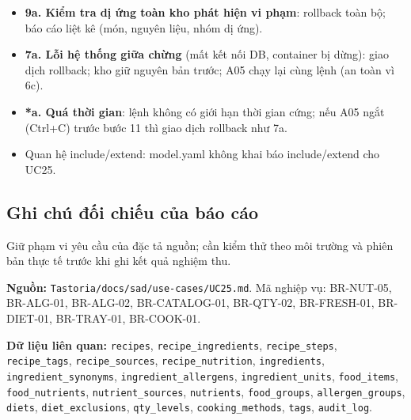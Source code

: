 \begin{itemize}
\item \textbf{9a. Kiểm tra dị ứng toàn kho phát hiện vi phạm}: rollback toàn bộ; báo cáo liệt kê (món, nguyên liệu, nhóm dị ứng).
\item \textbf{7a. Lỗi hệ thống giữa chừng} (mất kết nối DB, container bị dừng): giao dịch rollback; kho giữ nguyên bản trước; A05 chạy lại cùng lệnh (an toàn vì 6c).
\item \textbf{*a. Quá thời gian}: lệnh không có giới hạn thời gian cứng; nếu A05 ngắt (Ctrl+C) trước bước 11 thì giao dịch rollback như 7a.
\item Quan hệ include/\allowbreak{}extend: model.yaml không khai báo include/\allowbreak{}extend cho UC25.
\end{itemize}
\subsection{Ghi chú đối chiếu của báo cáo}
Giữ phạm vi yêu cầu của đặc tả nguồn; cần kiểm thử theo môi trường và phiên bản thực tế trước khi ghi kết quả nghiệm thu.

\textbf{Nguồn:} {\small\texttt{Tastoria/\allowbreak{}\allowbreak{}docs/\allowbreak{}\allowbreak{}sad/\allowbreak{}\allowbreak{}use-\allowbreak{}cases/\allowbreak{}\allowbreak{}UC25.\allowbreak{}md}}. Mã nghiệp vụ: BR-\allowbreak{}NUT-\allowbreak{}05, BR-\allowbreak{}ALG-\allowbreak{}01, BR-\allowbreak{}ALG-\allowbreak{}02, BR-\allowbreak{}CATALOG-\allowbreak{}01, BR-\allowbreak{}QTY-\allowbreak{}02, BR-\allowbreak{}FRESH-\allowbreak{}01, BR-\allowbreak{}DIET-\allowbreak{}01, BR-\allowbreak{}TRAY-\allowbreak{}01, BR-\allowbreak{}COOK-\allowbreak{}01.

\textbf{Dữ liệu liên quan:} {\small\texttt{recipes}}, {\small\texttt{recipe\_\allowbreak{}\allowbreak{}ingredients}}, {\small\texttt{recipe\_\allowbreak{}\allowbreak{}steps}}, {\small\texttt{recipe\_\allowbreak{}\allowbreak{}tags}}, {\small\texttt{recipe\_\allowbreak{}\allowbreak{}sources}}, {\small\texttt{recipe\_\allowbreak{}\allowbreak{}nutrition}}, {\small\texttt{ingredients}}, {\small\texttt{ingredient\_\allowbreak{}\allowbreak{}synonyms}}, {\small\texttt{ingredient\_\allowbreak{}\allowbreak{}allergens}}, {\small\texttt{ingredient\_\allowbreak{}\allowbreak{}units}}, {\small\texttt{food\_\allowbreak{}\allowbreak{}items}}, {\small\texttt{food\_\allowbreak{}\allowbreak{}nutrients}}, {\small\texttt{nutrient\_\allowbreak{}\allowbreak{}sources}}, {\small\texttt{nutrients}}, {\small\texttt{food\_\allowbreak{}\allowbreak{}groups}}, {\small\texttt{allergen\_\allowbreak{}\allowbreak{}groups}}, {\small\texttt{diets}}, {\small\texttt{diet\_\allowbreak{}\allowbreak{}exclusions}}, {\small\texttt{qty\_\allowbreak{}\allowbreak{}levels}}, {\small\texttt{cooking\_\allowbreak{}\allowbreak{}methods}}, {\small\texttt{tags}}, {\small\texttt{audit\_\allowbreak{}\allowbreak{}log}}.

